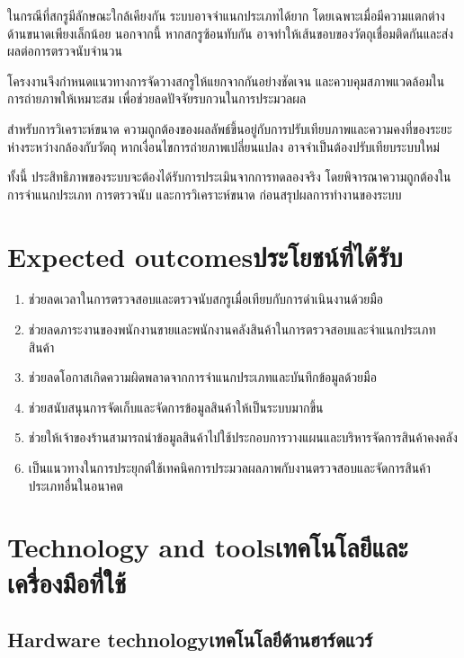 ในกรณีที่สกรูมีลักษณะใกล้เคียงกัน ระบบอาจจำแนกประเภทได้ยาก โดยเฉพาะเมื่อมีความแตกต่างด้านขนาดเพียงเล็กน้อย นอกจากนี้ หากสกรูซ้อนทับกัน อาจทำให้เส้นขอบของวัตถุเชื่อมติดกันและส่งผลต่อการตรวจนับจำนวน

โครงงานจึงกำหนดแนวทางการจัดวางสกรูให้แยกจากกันอย่างชัดเจน และควบคุมสภาพแวดล้อมในการถ่ายภาพให้เหมาะสม เพื่อช่วยลดปัจจัยรบกวนในการประมวลผล

สำหรับการวิเคราะห์ขนาด ความถูกต้องของผลลัพธ์ขึ้นอยู่กับการปรับเทียบภาพและความคงที่ของระยะห่างระหว่างกล้องกับวัตถุ หากเงื่อนไขการถ่ายภาพเปลี่ยนแปลง อาจจำเป็นต้องปรับเทียบระบบใหม่

ทั้งนี้ ประสิทธิภาพของระบบจะต้องได้รับการประเมินจากการทดลองจริง โดยพิจารณาความถูกต้องในการจำแนกประเภท การตรวจนับ และการวิเคราะห์ขนาด ก่อนสรุปผลการทำงานของระบบ

\section{\ifenglish Expected outcomes\else ประโยชน์ที่ได้รับ\fi}

\begin{enumerate}                                        
    \item ช่วยลดเวลาในการตรวจสอบและตรวจนับสกรูเมื่อเทียบกับการดำเนินงานด้วยมือ
    \item ช่วยลดภาระงานของพนักงานขายและพนักงานคลังสินค้าในการตรวจสอบและจำแนกประเภทสินค้า
    \item ช่วยลดโอกาสเกิดความผิดพลาดจากการจำแนกประเภทและบันทึกข้อมูลด้วยมือ
    \item ช่วยสนับสนุนการจัดเก็บและจัดการข้อมูลสินค้าให้เป็นระบบมากขึ้น
    \item ช่วยให้เจ้าของร้านสามารถนำข้อมูลสินค้าไปใช้ประกอบการวางแผนและบริหารจัดการสินค้าคงคลัง
    \item เป็นแนวทางในการประยุกต์ใช้เทคนิคการประมวลผลภาพกับงานตรวจสอบและจัดการสินค้าประเภทอื่นในอนาคต
\end{enumerate}

\section{\ifenglish Technology and tools\else เทคโนโลยีและเครื่องมือที่ใช้\fi}

\subsection{\ifenglish Hardware technology\else เทคโนโลยีด้านฮาร์ดแวร์\fi}

